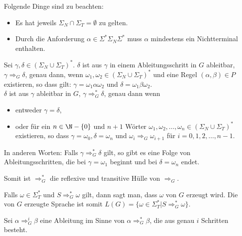 \begin{remark}
Folgende Dinge sind zu beachten:
\begin{itemize}
  \item Es hat jeweils $\Sigma_N \cap \Sigma_T = \emptyset$ zu gelten.
  \item Durch die Anforderung $\alpha \in \Sigma^* \Sigma_N \Sigma^*$ muss $\alpha$ mindestens ein Nichtterminal enthalten.\\
\end{itemize}
\end{remark}

\begin{definition}
Sei $\gamma, \delta \in (\Sigma_N \cup \Sigma_T)^*$. $\delta$ ist aus $\gamma$ in einem Ableitungsschritt in $G$ ableitbar, $\gamma \Rightarrow_G \delta$, genau dann, wenn $\omega_1, \omega_2 \in (\Sigma_N \cup \Sigma_T)^*$ und eine Regel $(\alpha, \beta) \in P$ existieren, so dass gilt: $\gamma = \omega_1 \alpha \omega_2$ und $\delta = \omega_1 \beta \omega_2$.\\

$\delta$ ist aus $\gamma$ ableitbar in $G$, $\gamma \Rightarrow_G^* \delta$, genau dann wenn
\begin{itemize}
  \item entweder $\gamma = \delta$,
  \item oder für ein $n \in \N - \{0\}$ und $n+1$ Wörter $\omega_1, \omega_2, \ldots, \omega_n \in (\Sigma_N \cup \Sigma_T)^*$ existieren, so dass $\gamma = \omega_0, \delta = \omega_n$ und $\omega_i \Rightarrow_G \omega_{i+1}$ für $i = 0, 1, 2, \ldots, n - 1$.
\end{itemize}
In anderen Worten: Falls $\gamma \Rightarrow_G^* \delta$ gilt, so gibt es eine Folge von Ableitungsschritten, die bei $\gamma = \omega_1$ beginnt und bei $\delta = \omega_n$ endet.

Somit ist $\Rightarrow_G^*$ die reflexive und transitive Hülle von $\Rightarrow_G$.\\
\end{definition}

\begin{definition}
Falls $\omega \in \Sigma_T^*$ und $S \Rightarrow_G^* \omega$ gilt, dann sagt man, dass $\omega$ von $G$ erzeugt wird. Die von $G$ erzeugte Sprache ist somit $L(G) = \{\omega \in \Sigma_T^* | S \Rightarrow_G^* \omega\}$.
\end{definition}

\begin{remark}
Sei $\alpha \Rightarrow_G^i \beta$ eine Ableitung im Sinne von $\alpha \Rightarrow_G^* \beta$, die aus genau $i$ Schritten besteht.
\end{remark}

